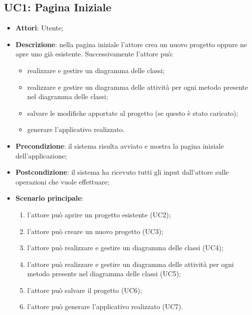 \subsection{UC1: Pagina Iniziale}
\label{UC1}
\begin{itemize}
\item \textbf{Attori}: Utente;
\item \textbf{Descrizione}: nella pagina iniziale l'attore crea un nuovo progetto oppure ne apre uno già esistente.
Successivamente l'attore può:
	\begin{itemize}
	\item realizzare e gestire un diagramma delle classi;
	\item realizzare e gestire un diagramma delle attività per ogni metodo presente nel diagramma delle classi;
	\item salvare le modifiche apportate al progetto (se questo è stato caricato);
	\item generare l'applicativo realizzato.
	\end{itemize}
\item \textbf{Precondizione}: il sistema risulta avviato e mostra la pagina iniziale dell'applicazione;
\item \textbf{Postcondizione}: il sistema ha ricevuto tutti gli input dall'attore sulle operazioni che vuole effettuare;
\item \textbf{Scenario principale}:
	\begin{enumerate}
	\item l'attore può aprire un progetto esistente (UC2);
	\item l'attore può creare un nuovo progetto (UC3);
	\item l'attore può realizzare e gestire un diagramma delle classi (UC4);
	\item l'attore può realizzare e gestire un diagramma delle attività per ogni metodo presente nel diagramma delle classi (UC5);
	\item l'attore può salvare il progetto (UC6);
	\item l'attore può generare l'applicativo realizzato (UC7).
	\end{enumerate}

\end{itemize}

